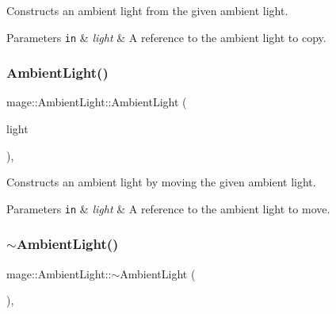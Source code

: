 Constructs an ambient light from the given ambient light.


\begin{DoxyParams}[1]{Parameters}
\mbox{\tt in}  & {\em light} & A reference to the ambient light to copy. \\
\hline
\end{DoxyParams}
\hypertarget{classmage_1_1_ambient_light_a2807ca8add5f34da2e63ef8fdb80f7e1}{}\label{classmage_1_1_ambient_light_a2807ca8add5f34da2e63ef8fdb80f7e1} 
\subsubsection{\texorpdfstring{Ambient\+Light()}{AmbientLight()}\hspace{0.1cm}{\footnotesize\ttfamily [3/3]}}
{\footnotesize\ttfamily mage\+::\+Ambient\+Light\+::\+Ambient\+Light (\begin{DoxyParamCaption}\item[{\hyperlink{classmage_1_1_ambient_light}{Ambient\+Light} \&\&}]{light }\end{DoxyParamCaption})\hspace{0.3cm}{\ttfamily [default]}, {\ttfamily [noexcept]}}

Constructs an ambient light by moving the given ambient light.


\begin{DoxyParams}[1]{Parameters}
\mbox{\tt in}  & {\em light} & A reference to the ambient light to move. \\
\hline
\end{DoxyParams}
\hypertarget{classmage_1_1_ambient_light_a511bb794b11f112e750da09f4044e7db}{}\label{classmage_1_1_ambient_light_a511bb794b11f112e750da09f4044e7db} 
\subsubsection{\texorpdfstring{$\sim$\+Ambient\+Light()}{~AmbientLight()}}
{\footnotesize\ttfamily mage\+::\+Ambient\+Light\+::$\sim$\+Ambient\+Light (\begin{DoxyParamCaption}{ }\end{DoxyParamCaption})\hspace{0.3cm}{\ttfamily [virtual]}, {\ttfamily [default]}}

